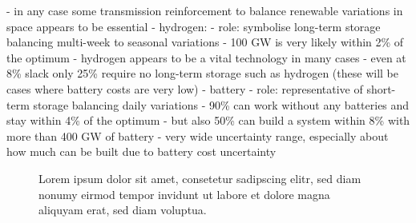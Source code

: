  - in any case some transmission reinforcement to balance renewable variations in space appears to be essential 
- hydrogen:
  - role: symbolise long-term storage balancing multi-week to seasonal variations
  - 100 GW is very likely within 2\% of the optimum
  - hydrogen appears to be a vital technology in many cases
  - even at 8\% slack only 25\% require no long-term storage such as hydrogen (these will be cases where battery costs are very low)
- battery
  - role: representative of short-term storage balancing daily variations
  - 90\% can work without any batteries and stay within 4\% of the optimum
  - but also 50\% can build a system within 8\% with more than 400 GW of battery
  - very wide uncertainty range, especially about how much can be built due to battery cost uncertainty


\begin{figure}
    \noindent{}
    \caption{Lorem ipsum dolor sit amet, consetetur sadipscing elitr, sed diam nonumy eirmod tempor invidunt ut labore et dolore magna aliquyam erat, sed diam voluptua.}
    \label{fig:dependencies}
\end{figure}

